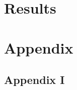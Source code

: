 %

\chapter{Results}



\begingroup
\raggedright



%
%

\endgroup

\appendix
\chapter{Appendix}
\section{Appendix I}\label{sec:KOOS}
%



